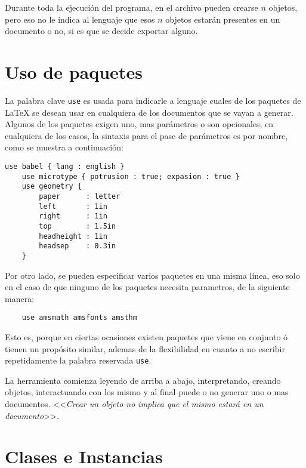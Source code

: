 \documentclass[12pt,letterpaper,titlepage,oneside,openright]{book}
\newcommand{\latex}{\LaTeX\xspace}
\begin{document}
Durante toda la ejecución del programa, en el archivo pueden crearse $n$
objetos, pero eso no le indica al lenguaje que esos $n$ objetos estarán
presentes en un documento o no, si es que se decide exportar alguno.

\section{Uso de paquetes}

La palabra clave \texttt{use} es usada para indicarle a lenguaje cuales de los
paquetes de \latex se desean usar en cualquiera de los documentos que se vayan a
generar. Algunos de los paquetes exigen uno, mas parámetros o son opcionales, en
cualquiera de los casos, la sintaxis para el pase de parámetros es por nombre,
como se muestra a continuación:

\begin{center}
\begin{lstlisting}[caption={Paquetes},label=pkgs]
    use babel { lang : english }
    use microtype { potrusion : true; expasion : true }
    use geometry {
        paper      : letter
        left       : 1in
        right      : 1in
        top        : 1.5in
        headheight : 1in
        headsep    : 0.3in
    }
\end{lstlisting}
\end{center}

Por otro lado, se pueden especificar varios paquetes en una misma linea, eso
solo en el caso de que ninguno de los paquetes necesita parametros, de la
siguiente manera:

\begin{center}
\begin{lstlisting}
    use amsmath amsfonts amsthm
\end{lstlisting}
\end{center}

Esto es, porque en ciertas ocasiones existen paquetes que viene en conjunto ó
tienen un propósito similar, ademas de la flexibilidad en cuanto a no escribir
repetidamente la palabra reservada \texttt{use}.

La herramienta comienza leyendo de arriba a abajo, interpretando, creando
objetos, interactuando con los mismo y al final puede o no generar uno o mas
documentos. <<\textit{Crear un objeto no implica que el mismo estará en un
documento}>>.

\section{Clases e Instancias}
\end{document}
